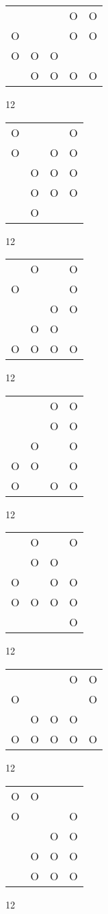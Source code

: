 \begin{tabular}{|m{0.2cm}m{0.2cm}m{0.2cm}m{0.2cm}m{0.2cm}|}\hline
 & & &O&O\\
O& & &O&O\\
O&O&O& & \\
 &O&O&O&O\\
\hline\end{tabular}12
\begin{tabular}{|m{0.2cm}m{0.2cm}m{0.2cm}m{0.2cm}|}\hline
O& & &O\\
O& &O&O\\
 &O&O&O\\
 &O&O&O\\
 &O& & \\
\hline\end{tabular}12
\begin{tabular}{|m{0.2cm}m{0.2cm}m{0.2cm}m{0.2cm}|}\hline
 &O& &O\\
O& & &O\\
 & &O&O\\
 &O&O& \\
O&O&O&O\\
\hline\end{tabular}12
\begin{tabular}{|m{0.2cm}m{0.2cm}m{0.2cm}m{0.2cm}|}\hline
 & &O&O\\
 & &O&O\\
 &O& &O\\
O&O& &O\\
O& &O&O\\
\hline\end{tabular}12
\begin{tabular}{|m{0.2cm}m{0.2cm}m{0.2cm}m{0.2cm}|}\hline
 &O& &O\\
 &O&O& \\
O& &O&O\\
O&O&O&O\\
 & & &O\\
\hline\end{tabular}12
\begin{tabular}{|m{0.2cm}m{0.2cm}m{0.2cm}m{0.2cm}m{0.2cm}|}\hline
 & & &O&O\\
O& & & &O\\
 &O&O&O& \\
O&O&O&O&O\\
\hline\end{tabular}12
\begin{tabular}{|m{0.2cm}m{0.2cm}m{0.2cm}m{0.2cm}|}\hline
O&O& & \\
O& & &O\\
 & &O&O\\
 &O&O&O\\
 &O&O&O\\
\hline\end{tabular}12
